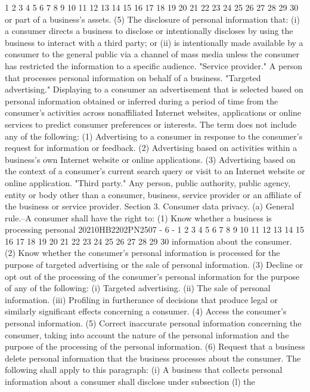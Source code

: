 1
2
3
4
5
6
7
8
9
10
11
12
13
14
15
16
17
18
19
20
21
22
23
24
25
26
27
28
29
30
or part of a business's assets.
(5) The disclosure of personal information that:
(i) a consumer directs a business to disclose or
intentionally discloses by using the business to interact
with a third party; or
(ii) is intentionally made available by a consumer
to the general public via a channel of mass media unless
the consumer has restricted the information to a specific
audience.
"Service provider." A person that processes personal
information on behalf of a business.
"Targeted advertising." Displaying to a consumer an
advertisement that is selected based on personal information
obtained or inferred during a period of time from the consumer's
activities across nonaffiliated Internet websites, applications
or online services to predict consumer preferences or interests.
The term does not include any of the following:
(1) Advertising to a consumer in response to the
consumer's request for information or feedback.
(2) Advertising based on activities within a business's
own Internet website or online applications.
(3) Advertising based on the context of a consumer's
current search query or visit to an Internet website or
online application.
"Third party." Any person, public authority, public agency,
entity or body other than a consumer, business, service provider
or an affiliate of the business or service provider.
Section 3. Consumer data privacy.
(a) General rule.--A consumer shall have the right to:
(1) Know whether a business is processing personal
20210HB2202PN2507 - 6 -
1
2
3
4
5
6
7
8
9
10
11
12
13
14
15
16
17
18
19
20
21
22
23
24
25
26
27
28
29
30
information about the consumer.
(2) Know whether the consumer's personal information is
processed for the purpose of targeted advertising or the sale
of personal information.
(3) Decline or opt out of the processing of the
consumer's personal information for the purpose of any of the
following:
(i) Targeted advertising.
(ii) The sale of personal information.
(iii) Profiling in furtherance of decisions that
produce legal or similarly significant effects concerning
a consumer.
(4) Access the consumer's personal information.
(5) Correct inaccurate personal information concerning
the consumer, taking into account the nature of the personal
information and the purpose of the processing of the personal
information.
(6) Request that a business delete personal information
that the business processes about the consumer. The following
shall apply to this paragraph:
(i) A business that collects personal information
about a consumer shall disclose under subsection (l) the
